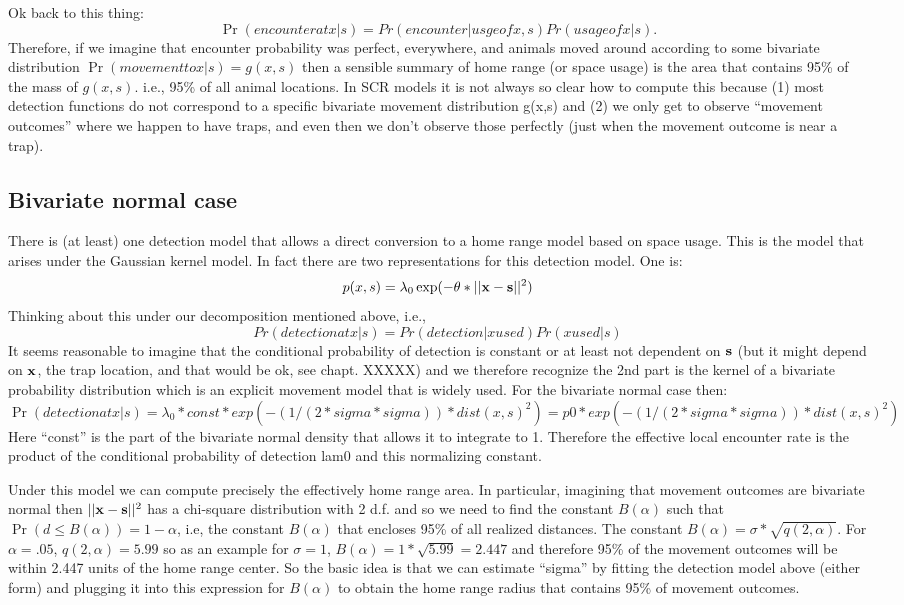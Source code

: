 Ok back to this thing: 
\[
 \Pr(encounter at x|s) = Pr(encounter | usge of x,s) Pr(usage of x|s).
\]
Therefore, if we imagine that encounter probability was perfect,
everywhere, and animals moved around according to some bivariate
distribution $\Pr(movement to x | s) = g(x,s)$ then a sensible summary
of home range (or space usage) is the area that contains 95\% of the
mass of $g(x,s)$. i.e., 95\% of all animal locations.  In SCR models it
is not always so clear how to compute this because (1) most detection
functions do not correspond to a specific bivariate movement
distribution g(x,s) and (2) we only get to observe ``movement outcomes''
where we happen to have traps, and even then we don't observe those
perfectly (just when the movement outcome is near a trap).


\subsection{Bivariate normal case}  

There is (at least) one detection model that allows a direct
conversion to a home range model based on space usage. This is the
model that arises under the Gaussian kernel model.  In fact there are
two representations for this detection model. One is:
\[
p(x,s) = \lambda_{0} \exp(-\theta*||{\bf x}-{\bf s}||^2)         
\]
Thinking about this under our decomposition mentioned above, i.e., 
\[
Pr(detection at x | s) = Pr(detection | x used)Pr(x used | s)
\]
It seems reasonable to imagine that the conditional probability of
detection is constant or at least not dependent on ${\bf s}$ (but it
might depend on ${\bf x}$, the trap location, and that would be ok,
see chapt. XXXXX) and we therefore recognize the 2nd part is the
kernel of a bivariate probability distribution which is an explicit
movement model that is widely used.  For the bivariate normal case
then:
\[
\Pr(detection at x | s) = \lambda_{0}*const*exp(- (1/(2*sigma*sigma))*dist(x,s)^2)
		            =  p0*exp(- (1/(2*sigma*sigma))*dist(x,s)^2)
\]
Here ``const'' is the part of the bivariate normal density that allows
it to integrate to 1. Therefore the effective local encounter rate is
the product of the conditional probability of detection lam0 and this
normalizing constant.

Under this model we can compute precisely the effectively home range
area. In particular, imagining that movement outcomes are bivariate
normal then $||{\bf x}-{\bf s}||^2$ has a chi-square distribution with
2 d.f. and so we need to find the constant $B(\alpha)$ such that
$\Pr(d\le B(\alpha)) = 1-\alpha$, i.e, the constant $B(\alpha)$ that
encloses 95\% of all realized distances. The constant $B(\alpha) =
\sigma*\sqrt{q(2,\alpha)}$. For $\alpha=.05$, $q(2,\alpha) = 5.99$ so
as an example for $\sigma=1$, $B(\alpha) = 1*\sqrt{5.99} = 2.447$ and
therefore 95\% of the movement outcomes will be within 2.447 units of
the home range center. So the basic idea is that we can estimate
``sigma'' by fitting the detection model above (either form) and
plugging it into this expression for $B(\alpha)$ to obtain the home
range radius that contains 95\% of movement outcomes.

